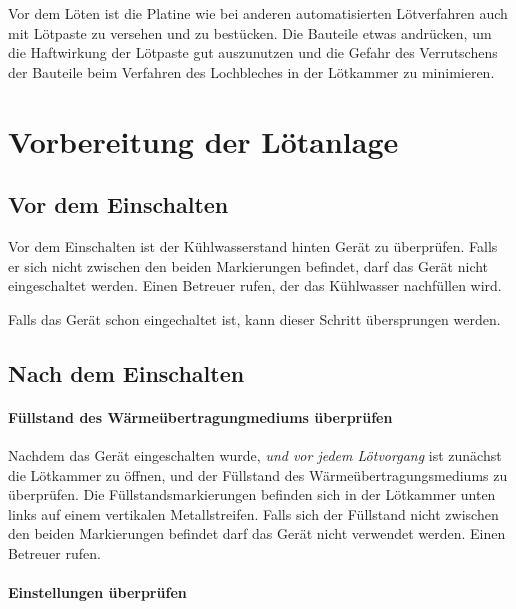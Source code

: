 \documentclass{\basedir/fablab-document}
\renewcommand{\todo}[1]{\textbf{\color{red}{TODO: #1}}}
\begin{document}
Vor dem L{\"o}ten ist die Platine wie bei anderen automatisierten L{\"o}tverfahren auch mit L{\"o}tpaste zu versehen und zu best{\"u}cken. Die Bauteile etwas andr{\"u}cken, um die Haftwirkung der L{\"o}tpaste gut auszunutzen und die Gefahr des Verrutschens der Bauteile beim Verfahren des Lochbleches in der L{\"o}tkammer zu minimieren.

\section{Vorbereitung der L{\"o}tanlage}
\subsection{Vor dem Einschalten}

Vor dem Einschalten ist der K{\"u}hlwasserstand hinten Ger{\"a}t zu {\"u}berpr{\"u}fen. Falls er sich nicht zwischen den beiden Markierungen befindet, darf das Ger{\"a}t nicht eingeschaltet werden. Einen Betreuer rufen, der das K{\"u}hlwasser nachf{\"u}llen wird.


Falls das Ger{\"a}t schon eingechaltet ist, kann dieser Schritt {\"u}bersprungen werden.

\subsection{Nach dem Einschalten}

\paragraph{F{\"u}llstand des W{\"a}rme{\"u}bertragungmediums {\"u}berpr{\"u}fen}

Nachdem das Ger{\"a}t eingeschalten wurde, \textit{und vor jedem L{\"o}tvorgang} ist zun{\"a}chst die L{\"o}tkammer zu {\"o}ffnen, und der F{\"u}llstand des W{\"a}rme{\"u}bertragungsmediums zu {\"u}berpr{\"u}fen. Die F{\"u}llstandsmarkierungen befinden sich in der L{\"o}tkammer unten links auf einem vertikalen Metallstreifen. Falls sich der F{\"u}llstand nicht zwischen den beiden Markierungen befindet darf das Ger{\"a}t nicht verwendet werden. Einen Betreuer rufen.


\paragraph{Einstellungen {\"u}berpr{\"u}fen}
\end{document}
